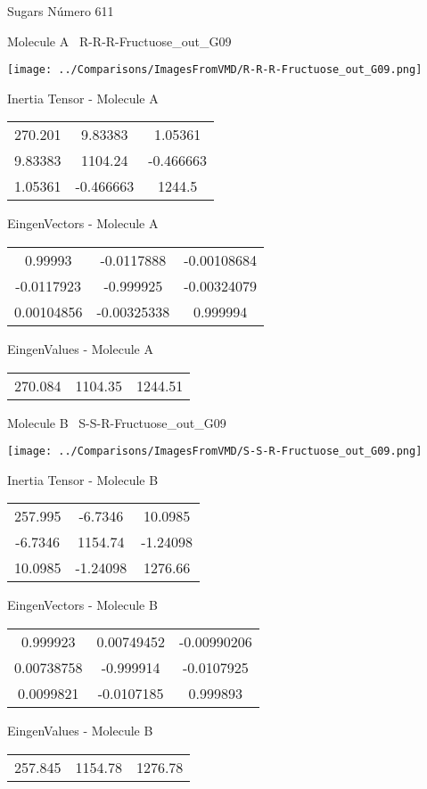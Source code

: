 \vtab[-3cm]
\begin{center}
{\large Sugars \tab Número 611}
\end{center}
\begin{multicols}{2}
\begin{center}

Molecule A \
R-R-R-Fructuose\_out\_G09

\texttt{[image: ../Comparisons/ImagesFromVMD/R-R-R-Fructuose\_out\_G09.png]}

Inertia Tensor - Molecule A \\
\begin{tabular}{|c c c|}
270.201	 & 	9.83383	 & 	1.05361	 \\
9.83383	 & 	1104.24	 & 	-0.466663	 \\
1.05361	 & 	-0.466663	 & 	1244.5
\end{tabular}

\vtab
 EingenVectors - Molecule A     \\
\begin{tabular}{|c c c|}
0.99993	 & 	-0.0117888	 & 	-0.00108684	 \\
-0.0117923	 & 	-0.999925	 & 	-0.00324079	 \\
0.00104856	 & 	-0.00325338	 & 	0.999994
\end{tabular}

\vtab
 EingenValues - Molecule A     \\
\begin{tabular}{|c c c|}
270.084	 & 	1104.35	 & 	1244.51	 \\
\end{tabular}
\columnbreak

Molecule B \
S-S-R-Fructuose\_out\_G09

\texttt{[image: ../Comparisons/ImagesFromVMD/S-S-R-Fructuose\_out\_G09.png]}

Inertia Tensor - Molecule B \\
\begin{tabular}{|c c c|}
257.995	 & 	-6.7346	 & 	10.0985	 \\
-6.7346	 & 	1154.74	 & 	-1.24098	 \\
10.0985	 & 	-1.24098	 & 	1276.66
\end{tabular}

\vtab
 EingenVectors - Molecule B     \\
\begin{tabular}{|c c c|}
0.999923	 & 	0.00749452	 & 	-0.00990206	 \\
0.00738758	 & 	-0.999914	 & 	-0.0107925	 \\
0.0099821	 & 	-0.0107185	 & 	0.999893
\end{tabular}

\vtab
 EingenValues - Molecule B     \\
\begin{tabular}{|c c c|}
257.845	 & 	1154.78	 & 	1276.78	 \\
\end{tabular}

\end{center}
\end{multicols}

